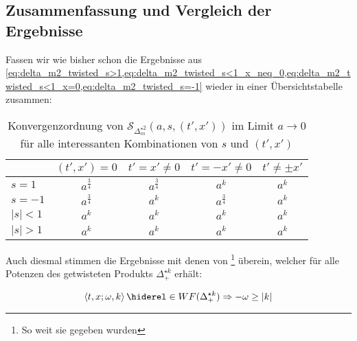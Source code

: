 \subsection{Zusammenfassung und Vergleich der Ergebnisse}
Fassen wir wie bisher schon die Ergebnisse aus \cref{eq:delta_m2_twisted_s>1,eq:delta_m2_twisted_s<1_x_neq_0,eq:delta_m2_twisted_s<1_x=0,eq:delta_m2_twisted_s=-1} wieder in einer Übersichtstabelle zusammen:

\begin{table}[h]
\centering
\begin{tabular}{l|cccc}
        & $(t',x') = 0$     & $t'=x' \neq 0$    & $t'=-x' \neq 0$   & $t' \neq \pm x'$ \\ \hline
$s=1$   & $a^{\frac{3}{4}}$ & $a^{\frac{3}{4}}$ & $a^k$             & $a^k$            \\
$s=-1$  & $a^{\frac{3}{4}}$ & $a^k$             & $a^{\frac{3}{4}}$ & $a^k$            \\
$|s|<1$ & $a^k$             & $a^k$             & $a^k$             & $a^k$            \\
$|s|>1$ & $a^k$             & $a^k$             & $a^k$             & $a^k$
\end{tabular}
\caption{Konvergenzordnung von $\mathcal{S}_{\Delta_m^{\star 2}}(a,s,(t',x'))$ im Limit $a \to 0$ für alle interessanten Kombinationen von $s$ und $(t',x')$}
\label{tab:wavefrontset_delta_m2_twisted}
\end{table}

Auch diesmal stimmen die Ergebnisse mit denen von \textcite[Prop. 3.72]{Schulz2014}\footnote{So weit sie gegeben wurden} überein, welcher für alle Potenzen des getwisteten Produkts $\Delta_+^{\star k}$ erhält:

\begin{equation*}
\left\langle t,x; \omega, k \right\rangle \hiderel\in WF(\Delta_+^{\star k})
\Rightarrow
- \omega \geq |k|
\end{equation*}


